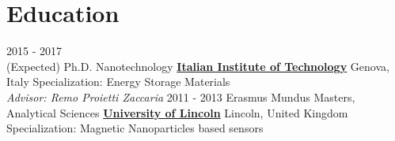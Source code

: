 \documentclass[letterpaper]{twentysecondcv} %
\begin{document}
\makeprofile %



\section{Education}



\begin{twenty} %
	\twentyitem
    	{2015 - 2017 \\ (Expected)}
        {Ph.D. Nanotechnology}
        {\href{https://www.iit.it/}{\textbf{Italian Institute of Technology}}}
        {Genova, Italy}
        {Specialization: Energy Storage Materials
        \\ \textit{Advisor: Remo Proietti Zaccaria}}
	\twentyitem
    	{2011 - 2013}
        {Erasmus Mundus Masters, Analytical Sciences}
        {\href{https://www.lincoln.ac.uk/home/}{\textbf{University of Lincoln}}}
        {Lincoln, United Kingdom}
        {Specialization: Magnetic Nanoparticles based sensors}
\end{twenty}
\end{document}
